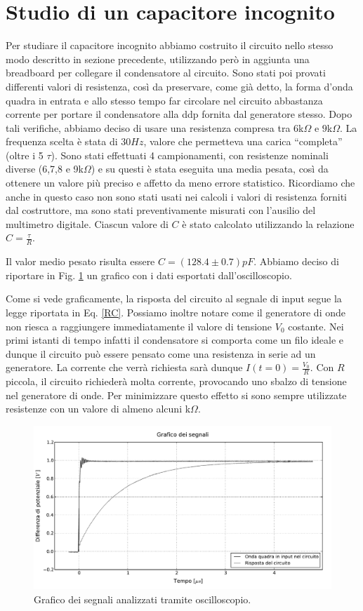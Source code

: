 \section{Studio di un capacitore incognito}
Per studiare il capacitore incognito abbiamo costruito il circuito nello stesso modo descritto in sezione precedente, utilizzando però in aggiunta una breadboard per collegare il condensatore al circuito. Sono stati poi provati differenti valori di resistenza, così da preservare, come già detto, la forma d'onda quadra in entrata e allo stesso tempo far circolare nel circuito abbastanza corrente per portare il condensatore alla ddp fornita dal generatore stesso. Dopo tali verifiche, abbiamo deciso di usare una resistenza compresa tra $6$k$\Omega$ e $9$k$\Omega$. La frequenza scelta è stata di $30Hz$, valore che permetteva una carica ``completa'' (oltre i 5 $\tau$). Sono stati effettuati 4 campionamenti, con resistenze nominali diverse (6,7,8 e 9k$\Omega$) e su questi è stata eseguita una media pesata, così da ottenere un valore più preciso e affetto da meno errore statistico.
Ricordiamo che anche in questo caso non sono stati usati nei calcoli i valori di resistenza forniti dal costruttore, ma sono stati preventivamente misurati con l'ausilio del multimetro digitale. Ciascun valore di $C$ è stato calcolato utilizzando la relazione $C=\frac{\tau}{R}$.

Il valor medio pesato risulta essere $C=(128.4\pm0.7) pF$. Abbiamo deciso di riportare in Fig. \ref{fig:1} un grafico con i dati esportati dall'oscilloscopio. 

Come si vede graficamente, la risposta del circuito al segnale di input segue la legge riportata in Eq. \ref{RC}. 
Possiamo inoltre notare come il generatore di onde non riesca a raggiungere immediatamente il valore di tensione $V_0$ costante. Nei primi istanti di tempo infatti il condensatore si comporta come un filo ideale e dunque il circuito può essere pensato come una resistenza in serie ad un generatore. La corrente che verrà richiesta sarà dunque $I(t=0)=\frac{V_0}{R}$. Con $R$ piccola, il circuito richiederà molta corrente, provocando uno sbalzo di tensione nel generatore di onde. Per minimizzare questo effetto si sono sempre utilizzate resistenze con un valore di almeno alcuni k$\Omega$.
\begin{figure}[h]
    \centering
        \includegraphics[width=0.73 \textwidth]{figure3.pdf}%
        \caption{Grafico dei segnali analizzati tramite oscilloscopio.}
        \label{fig:1}
\end{figure}